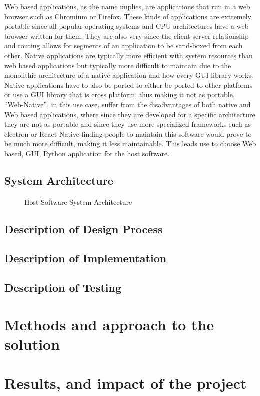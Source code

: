 \documentclass[12pt]{article}
\begin{document}
Web based applications, as the name implies, are applications that run in a web browser such as Chromium or Firefox. These kinds of applications are extremely portable since all popular operating systems and CPU architectures have a web browser written for them. They are also very since the client-server relationship and routing allows for segments of an application to be sand-boxed from each other. Native applications are typically more efficient with system resources than web based applications but typically more difficult to maintain due to the monolithic architecture of a native application and how every GUI library works. Native applications have to also be ported to either be ported to other platforms or use a GUI library that is cross platform, thus making it not as portable. ``Web-Native'', in this use case, suffer from the disadvantages of both native and Web based applications, where since they are developed for a specific architecture they are not as portable and since they use more specialized frameworks such as electron or React-Native finding people to maintain this software would prove to be much more difficult, making it less maintainable. This leads use to choose Web based, GUI, Python application for the host software.\\
\subsection{System Architecture}
\begin{figure}[H]
	\caption{Host Software System Architecture}
\end{figure}
\subsection{Description of Design Process}
\subsection{Description of Implementation}
\subsection{Description of Testing}
\section{Methods and approach to the solution}
\section{Results, and impact of the project}
\end{document}

